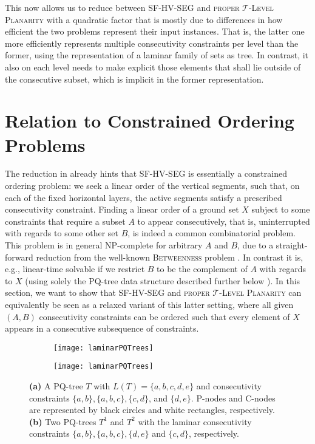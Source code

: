 \documentclass[runningheads]{llncs}
\newcommand{\tlp}{\textsc{proper $\mathcal T$-Level Planarity}\xspace}
\newcommand{\hvp}{\textsc{SF-HV-SEG}\xspace}
\begin{document}
This now allows us to reduce between \hvp and \tlp with a quadratic factor that is mostly due to differences in how efficient the two problems represent their input instances.
That is, the latter one more efficiently represents multiple consecutivity constraints per level than the former, using the representation of a laminar family of sets as tree.
In contrast, it also on each level needs to make explicit those elements that shall lie outside of the consecutive subset, which is implicit in the former representation.


\section{Relation to Constrained Ordering Problems}\label{sec:seqpq}
The reduction in  already hints that \hvp is essentially a constrained ordering problem: we seek a linear order of the vertical segments, such that, on each of the fixed horizontal layers, the active segments satisfy a prescribed consecutivity constraint.
Finding a linear order of a ground set $X$ subject to some constraints that require a subset $A$ to appear consecutively, that is, uninterrupted with regards to some other set $B$, is indeed a common combinatorial problem.
This problem is in general NP-complete for arbitrary $A$ and $B$, due to a straight-forward reduction from the well-known \textsc{Betweenness} problem \cite{opa-top-79}.
In contrast it is, e.g., linear-time solvable if we restrict $B$ to be the complement of $A$ with regards to $X$ (using solely the PQ-tree data structure described further below \cite{bl-tcopi-76}).
In this section, we want to show that \hvp and \tlp can equivalently be seen as a relaxed variant of this latter setting, where all given $(A,B)$ consecutivity constraints can be ordered such that every element of $X$ appears in a consecutive subsequence of constraints.

\begin{figure}[t]
  \begin{subfigure}{.45\textwidth}
    \centering
    \texttt{[image: laminarPQTrees]}
    \subcaption{}
    \label{fig:pqtree}
  \end{subfigure}
  \begin{subfigure}{.55\textwidth}
    \centering
    \texttt{[image: laminarPQTrees]}
    \subcaption{}
    \label{fig:laminar}
  \end{subfigure}
  \caption{
    \textbf{(a)} A PQ-tree $T$ with $L(T) = \{a,b,c,d,e\}$ and consecutivity constraints $\{a,b\}, \{a,b,c\}, \{c, d\}$, and $\{d, e\}$. P-nodes and C-nodes are represented by black circles and white rectangles, respectively.
    \textbf{(b)} Two PQ-trees $T^1$ and $T^2$ with the laminar consecutivity constraints $\{a,b\}, \{a,b,c\}, \{d,e\}$ and $\{c, d\}$, respectively.
  }
  \label{fig:pq-trees}
\end{figure}
\end{document}
